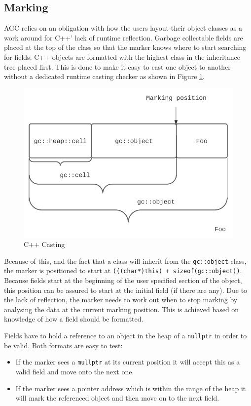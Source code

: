\documentclass[11pt]{article}
\begin{document}
\subsection{Marking}
AGC relies on an obligation with how the users layout their object classes as a work around for C++' lack of 
runtime reflection.
Garbage collectable fields are placed at the top of the class so that the marker knows where to start
searching for fields. C++ objects are formatted with the highest class in the inheritance tree placed first.
This is done to make it easy to cast one object to another without a dedicated runtime casting checker
as shown in Figure \ref{fig:cppcasting}.
\begin{figure}
\begin{center}
\includegraphics[scale=0.5]{./report_srcs/c_plus_plus_casting.png}
\end{center}
\caption{C++ Casting}
\label{fig:cppcasting}
\end{figure}

Because of this, and the fact that a class will inherit from the \texttt{gc::object} class, the marker is
positioned to start at \texttt{(((char*)this) + sizeof(gc::object))}. Because fields start at the beginning
of the user specified section of the object, this position can be assured to start at the initial field
(if there are any).
Due to the lack of reflection, the marker needs to work out when to stop marking by analysing the data at
the current marking position. This is achieved based on knowledge of how a field should be formatted.

Fields have to hold a reference to an object in the heap of a \texttt{nullptr} in order to be valid. Both formats
are easy to test:
\begin{itemize}
\item If the marker sees a \texttt{mullptr} at its current position it will accept this as a valid field
and move onto the next one.
\item If the marker sees a pointer address which is within the range of the heap it will mark the referenced
object and then move on to the next field.
\end{itemize}
\end{document}
